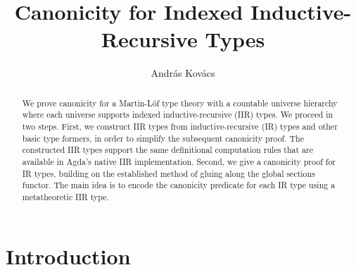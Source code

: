 \documentclass[acmsmall,screen,review]{acmart}
\begin{document}
\title{Canonicity for Indexed Inductive-Recursive Types}

\author{András Kovács}


\begin{abstract}
We prove canonicity for a Martin-Löf type theory with a countable universe hierarchy where each
universe supports indexed inductive-recursive (IIR) types. We proceed in two steps. First, we
construct IIR types from inductive-recursive (IR) types and other basic type formers, in order to
simplify the subsequent canonicity proof. The constructed IIR types support the same definitional
computation rules that are available in Agda's native IIR implementation. Second, we give a
canonicity proof for IR types, building on the established method of gluing along the global
sections functor. The main idea is to encode the canonicity predicate for each IR type using a
metatheoretic IIR type.
\end{abstract}


\maketitle

\section{Introduction}\label{sec:introduction}
\end{document}
